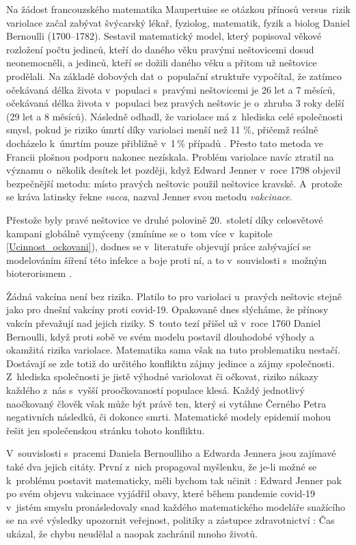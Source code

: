 Na žádost francouzského matematika Maupertuise se otázkou přínosů versus\ rizik variolace začal zabývat švýcarský lékař, fyziolog, matematik, fyzik a biolog Daniel Bernoulli (1700--1782). Sestavil matematický model, který popisoval věkové rozložení počtu jedinců, kteří do daného věku pravými neštovicemi dosud neonemocněli, a jedinců, kteří se dožili daného věku a přitom už neštovice prodělali. Na základě dobových dat o~populační struktuře vypočítal, že zatímco očekávaná délka života v~populaci s~pravými neštovicemi je 26 let a 7 měsíců, očekávaná délka života v~populaci bez pravých neštovic je o~zhruba 3 roky delší (29 let a 8 měsíců). Následně odhadl, že variolace má z~hlediska celé společnosti smysl, pokud je riziko úmrtí díky variolaci menší než 11 \%, přičemž reálně docházelo k~úmrtím pouze přibližně v~1\,\% případů \cite{Bacaer2011}. Přesto tato metoda ve Francii plošnou podporu nakonec nezískala. Problém variolace navíc ztratil na významu o~několik desítek let později, když Edward Jenner v~roce 1798 objevil bezpečnější metodu: místo pravých neštovic použil neštovice kravské. A~protože se kráva latinsky řekne  \emph{vacca}, nazval Jenner svou metodu \emph{vakcinace}. 

Přestože byly pravé neštovice ve druhé polovině 20.\ století díky celosvětové kampani globálně vymýceny (zmíníme se o~tom více v~kapitole \ref{Ucinnost_ockovani}), dodnes se v~literatuře objevují práce zabývající se modelováním šíření této infekce a boje proti ní, a to v~souvislosti s~možným bioterorismem \cite{Bozzette_etal2003,Longini_etal2007}.

Žádná vakcína není bez rizika. Platilo to pro variolaci u~pravých neštovic stejně jako pro dnešní vakcíny proti covid-19. Opakovaně dnes slýcháme, že přínosy vakcín převažují nad jejich riziky. S~touto tezí přišel už v~roce 1760 Daniel Bernoulli, když proti sobě ve svém modelu postavil dlouhodobé výhody a okamžitá rizika variolace. Matematika sama však na tuto problematiku nestačí. Dostávají se zde totiž do určitého konfliktu zájmy jedince a zájmy společnosti. Z~hlediska společnosti je jistě výhodné variolovat či očkovat, riziko nákazy každého z~nás s~vyšší proočkovaností populace klesá. Každý jednotlivý naočkovaný člověk však může být právě ten, který si vytáhne Černého Petra negativních následků, či dokonce smrti. Matematické modely epidemií mohou řešit jen společenskou stránku tohoto konfliktu.

V~souvislosti s~pracemi Daniela Bernoulliho a Edwarda Jennera jsou zajímavé také dva jejich citáty. První z~nich propagoval myšlenku, že je-li možné se k~problému postavit matematicky, měli bychom tak učinit \cite{Bacaer2011}:  Edward Jenner pak po svém objevu vakcinace vyjádřil obavy, které během pandemie covid-19 v~jistém smyslu pronásledovaly snad každého matematického modeláře snažícího se na své výsledky upozornit veřejnost, politiky a zástupce zdravotnictví \cite{JennerCitat}:  Čas ukázal, že chybu neudělal a naopak zachránil mnoho životů.

